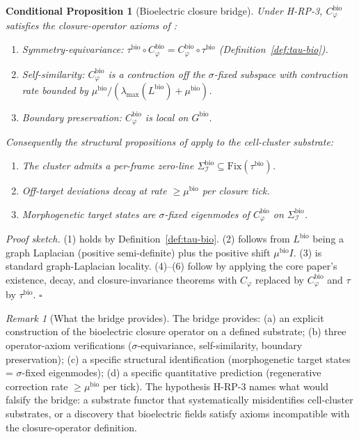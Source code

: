 \documentclass[11pt]{article}
\theoremstyle{plain}
\newtheorem{conditional}[theorem]{Conditional Proposition}
\theoremstyle{definition}
\theoremstyle{remark}
\newtheorem{remark}[theorem]{Remark}
\newcommand{\Fix}{\mathrm{Fix}}
\newcommand{\Ical}{\mathcal{I}}
\newcommand{\Cph}{C_\varphi}
\begin{document}
\begin{conditional}[Bioelectric closure bridge]\label{thm:levin-bridge}
Under H-RP-3, $\Cph^{\mathrm{bio}}$ satisfies the closure-operator axioms of \citet{SmartExistenceClosure}:
\begin{enumerate}[leftmargin=2em]
\item Symmetry-equivariance: $\tau^{\mathrm{bio}} \circ \Cph^{\mathrm{bio}} = \Cph^{\mathrm{bio}} \circ \tau^{\mathrm{bio}}$ (Definition~\ref{def:tau-bio}).
\item Self-similarity: $\Cph^{\mathrm{bio}}$ is a contraction off the $\sigma$-fixed subspace with contraction rate bounded by $\mu^{\mathrm{bio}} / (\lambda_{\max}(L^{\mathrm{bio}}) + \mu^{\mathrm{bio}})$.
\item Boundary preservation: $\Cph^{\mathrm{bio}}$ is local on $G^{\mathrm{bio}}$.
\end{enumerate}
Consequently the structural propositions of \citet{SmartExistenceClosure} apply to the cell-cluster substrate:
\begin{enumerate}[leftmargin=2em, start=4]
\item The cluster admits a per-frame zero-line $\Sigma_\Ical^{\mathrm{bio}} \subseteq \Fix(\tau^{\mathrm{bio}})$.
\item Off-target deviations decay at rate $\geq \mu^{\mathrm{bio}}$ per closure tick.
\item Morphogenetic target states are $\sigma$-fixed eigenmodes of $\Cph^{\mathrm{bio}}$ on $\Sigma_\Ical^{\mathrm{bio}}$.
\end{enumerate}
\end{conditional}

\noindent\emph{Proof sketch.} (1) holds by Definition~\ref{def:tau-bio}. (2) follows from $L^{\mathrm{bio}}$ being a graph Laplacian (positive semi-definite) plus the positive shift $\mu^{\mathrm{bio}} I$. (3) is standard graph-Laplacian locality. (4)--(6) follow by applying the core paper's existence, decay, and closure-invariance theorems with $\Cph$ replaced by $\Cph^{\mathrm{bio}}$ and $\tau$ by $\tau^{\mathrm{bio}}$. \hfill$\square$

\begin{remark}[What the bridge provides]\label{rem:levin-bridge-content}
The bridge provides: (a) an explicit construction of the bioelectric closure operator on a defined substrate; (b) three operator-axiom verifications ($\sigma$-equivariance, self-similarity, boundary preservation); (c) a specific structural identification (morphogenetic target states = $\sigma$-fixed eigenmodes); (d) a specific quantitative prediction (regenerative correction rate $\geq \mu^{\mathrm{bio}}$ per tick). The hypothesis H-RP-3 names what would falsify the bridge: a substrate functor that systematically misidentifies cell-cluster substrates, or a discovery that bioelectric fields satisfy axioms incompatible with the closure-operator definition.
\end{remark}
\end{document}
